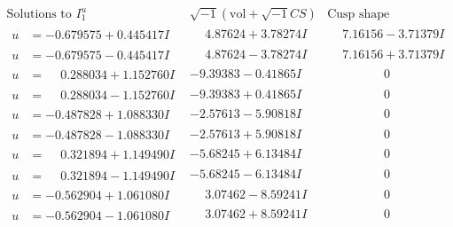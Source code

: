 \documentclass[1p]{elsarticle_modified}
\theoremstyle{definition}
\newcommand{\I}{\sqrt{-1}}
\begin{document}
$$\begin{array}{c|c|c}
\text{Solutions to }I^u_{1}& \I (\text{vol} + \sqrt{-1}CS) & \text{Cusp shape}\\
 \hline 
\begin{aligned}
u &= -0.679575 + 0.445417 I\end{aligned}
 & \phantom{-}4.87624 + 3.78274 I & \phantom{-}7.16156 - 3.71379 I \\ \hline\begin{aligned}
u &= -0.679575 - 0.445417 I\end{aligned}
 & \phantom{-}4.87624 - 3.78274 I & \phantom{-}7.16156 + 3.71379 I \\ \hline\begin{aligned}
u &= \phantom{-}0.288034 + 1.152760 I\end{aligned}
 & -9.39383 - 0.41865 I & \phantom{-0.000000 } 0 \\ \hline\begin{aligned}
u &= \phantom{-}0.288034 - 1.152760 I\end{aligned}
 & -9.39383 + 0.41865 I & \phantom{-0.000000 } 0 \\ \hline\begin{aligned}
u &= -0.487828 + 1.088330 I\end{aligned}
 & -2.57613 - 5.90818 I & \phantom{-0.000000 } 0 \\ \hline\begin{aligned}
u &= -0.487828 - 1.088330 I\end{aligned}
 & -2.57613 + 5.90818 I & \phantom{-0.000000 } 0 \\ \hline\begin{aligned}
u &= \phantom{-}0.321894 + 1.149490 I\end{aligned}
 & -5.68245 + 6.13484 I & \phantom{-0.000000 } 0 \\ \hline\begin{aligned}
u &= \phantom{-}0.321894 - 1.149490 I\end{aligned}
 & -5.68245 - 6.13484 I & \phantom{-0.000000 } 0 \\ \hline\begin{aligned}
u &= -0.562904 + 1.061080 I\end{aligned}
 & \phantom{-}3.07462 - 8.59241 I & \phantom{-0.000000 } 0 \\ \hline\begin{aligned}
u &= -0.562904 - 1.061080 I\end{aligned}
 & \phantom{-}3.07462 + 8.59241 I & \phantom{-0.000000 } 0 \\ \hline\begin{aligned}

\end{aligned}
\end{array}$$
\end{document}
